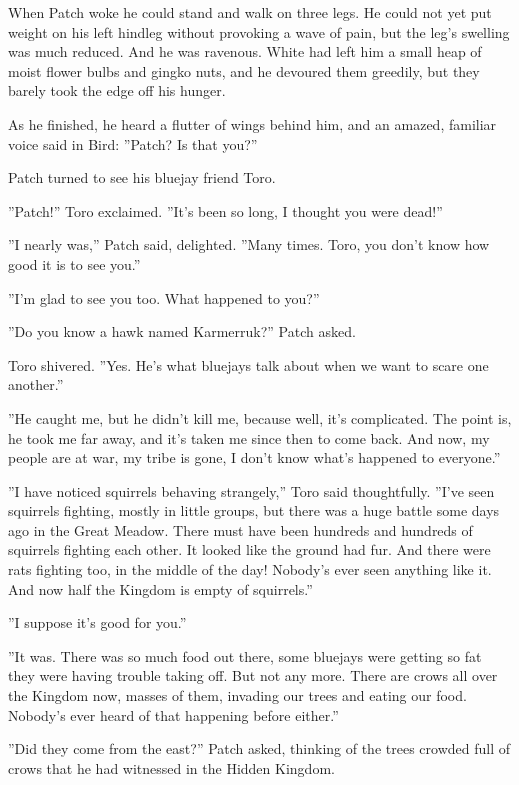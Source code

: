 \documentclass[12pt]{book}
\begin{document}
 When Patch woke he could stand and walk on three legs. He could not yet put weight on his left hindleg without provoking a wave of pain, but the leg's swelling was much reduced. And he was ravenous. White had left him a small heap of moist flower bulbs and gingko nuts, and he devoured them greedily, but they barely took the edge off his hunger.\par
 As he finished, he heard a flutter of wings behind him, and an amazed, familiar voice said in Bird: ''Patch? Is that you?''\par
 Patch turned to see his bluejay friend Toro.\par
 ''Patch!'' Toro exclaimed. ''It's been so long, I thought you were dead!''\par
 ''I nearly was,'' Patch said, delighted. ''Many times. Toro, you don't know how good it is to see you.''\par
 ''I'm glad to see you too. What happened to you?''\par
 ''Do you know a hawk named Karmerruk?'' Patch asked.\par
 Toro shivered. ''Yes. He's what bluejays talk about when we want to scare one another.''\par
 ''He caught me, but he didn't kill me, because %
 well, it's complicated. The point is, he took me far away, and it's taken me since then to come back. And now, my people are at war, my tribe is gone, I don't know what's happened to everyone.''\par
 ''I have noticed squirrels behaving strangely,'' Toro said thoughtfully. ''I've seen squirrels fighting, mostly in little groups, but there was a huge battle some days ago in the Great Meadow. There must have been hundreds and hundreds of squirrels fighting each other. It looked like the ground had fur. And there were rats fighting too, in the middle of the day! Nobody's ever seen anything like it. And now half the Kingdom is empty of squirrels.''\par
 ''I suppose it's good for you.''\par
 ''It was. There was so much food out there, some bluejays were getting so fat they were having trouble taking off. But not any more. There are crows all over the Kingdom now, masses of them, invading our trees and eating our food. Nobody's ever heard of that happening before either.''\par
 ''Did they come from the east?'' Patch asked, thinking of the trees crowded full of crows that he had witnessed in the Hidden Kingdom.\par
\end{document}
